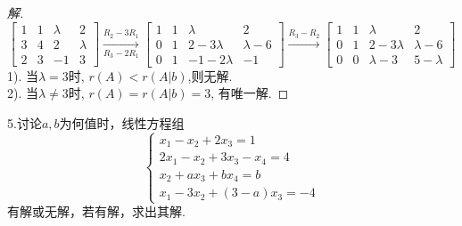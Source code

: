 \documentclass[10pt,a4paper]{report}
\begin{document}
\begin{proof}[解]
	$$
	\left[
	\begin{matrix}
	1 & 1 & \lambda & 2 \\
	3 & 4 & 2 & \lambda \\
	2 & 3 & -1 & 3
	\end{matrix}
	\right] \xrightarrow[R_{3}-2R_{1}]{R_{2}-3R_{1}}
	\left[
	\begin{matrix}
	1 & 1 & \lambda & 2 \\
	0 & 1 & 2-3\lambda & \lambda - 6 \\
	0 & 1 & -1-2\lambda & -1
	\end{matrix}
	\right] \xrightarrow{R_{3}-R_{2}}
	\left[
	\begin{matrix}
	1 & 1 & \lambda & 2 \\
	0 & 1 & 2-3\lambda & \lambda - 6 \\
	0 & 0 & \lambda -3& 5-\lambda
	\end{matrix}
	\right]
	$$
	1). 当$\lambda = 3$时, $r(A) < r(A|b)$,则无解.\\
	2). 当$\lambda \neq 3$时, $r(A) = r(A|b) = 3$, 有唯一解.
\end{proof}
\noindent 5.讨论$a,b$为何值时，线性方程组
$$
\left\{
\begin{aligned}
x_{1}-x_{2}+2x_{3}=1\\
2x_{1}-x_{2}+3x_{3}-x_{4}=4\\
x_{2}+ax_{3}+bx_{4}=b\\
x_{1}-3x_{2}+(3-a)x_{3}=-4
\end{aligned}
\right.
$$
有解或无解，若有解，求出其解.
\end{document}
